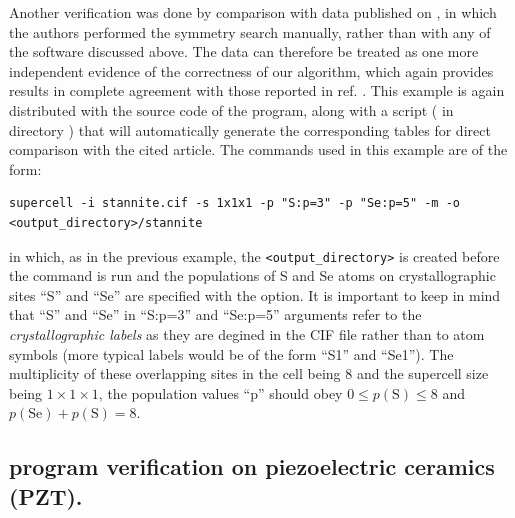 \documentclass[a4paper,10pt]{article}
\begin{document}
Another verification was done by comparison with data published on \cite{Dun2014}, in which the authors performed the symmetry search manually, rather than with any of the software discussed above. The data can therefore be treated as one more independent evidence of the correctness of our algorithm, which again provides results in complete agreement with those reported in ref. \cite{Dun2014}. This example is again distributed with the source code of the \sups{} program, along with a script ( in directory ) that will automatically generate the corresponding tables for direct comparison with the cited article. The \sups{} commands used in this example are of the form:
\begin{Verbatim}[breaklines]
  supercell -i stannite.cif -s 1x1x1 -p "S:p=3" -p "Se:p=5" -m -o <output_directory>/stannite
\end{Verbatim}
in which, as in the previous example, the \texttt{<output\_directory>} is created before the command is run and the populations of S and Se atoms on crystallographic sites ``S'' and ``Se'' are specified with the  option. It is important to keep in mind that ``S'' and ``Se'' in ``S:p=3'' and ``Se:p=5'' arguments refer to the \textit{crystallographic labels} as they are degined in the CIF file rather than to atom symbols (more typical labels would be of the form ``S1'' and ``Se1''). The multiplicity of these overlapping sites in the cell being 8 and the supercell size being $1\times1\times1$, the population values ``p'' should obey $0 \leq p(\text{S})\leq 8$ and $p(\text{Se}) + p(\text{S})=8$.

\subsection*{\Sups{} program verification on piezoelectric ceramics  (PZT).}
\end{document}
